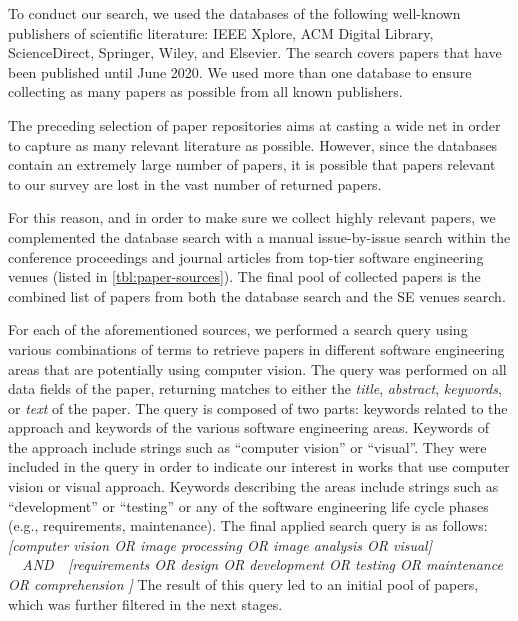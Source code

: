 To conduct our search, we used the databases of the following
well-known publishers of scientific literature:
IEEE Xplore, ACM Digital Library, ScienceDirect, Springer, Wiley, and Elsevier.
The search covers papers that have been published until June 2020. 
We used more than one database to ensure collecting
as many papers as possible from all known publishers.

The preceding selection of paper repositories
aims at casting a wide net in order to capture as many
relevant literature as possible.
However, since the databases contain an extremely large
number of papers, it is possible that papers 
relevant to our survey are lost in the vast number of returned papers.

For this reason, and in order to make sure we collect highly relevant papers, we complemented the database search with a manual issue-by-issue search within the conference proceedings and journal articles from 
top-tier software engineering venues (listed in \autoref{tbl:paper-sources}).
The final pool of collected papers is the combined list of papers from both the database search and the SE venues search.


 For each of the aforementioned sources, 
we performed a search query using various combinations
of terms to retrieve papers in different software engineering areas
that are potentially using computer vision.
The query was performed on all data fields of the paper,
returning matches to either the \emph{title}, \emph{abstract},
\emph{keywords}, or \emph{text} of the paper.
The query is composed of two parts: keywords related to the approach
and keywords of the various software engineering areas.
Keywords of the approach include strings such as
``computer vision'' or ``visual''.
They were included in the query in order to indicate
our interest in works that use computer vision or visual approach.
Keywords describing the areas include strings such as
``development'' or ``testing'' or any of the software engineering
life cycle phases (e.g., requirements, maintenance).
The final applied search query is as follows:
\emph{{[}computer vision {OR} image processing 
{OR} image analysis {OR} visual{]}
\ \ {AND}\ \ 
{[}requirements {OR} design {OR} development 
{OR} testing {OR} maintenance {OR} comprehension {]}}
The result of this query led to an initial pool of \initialPoolSize papers,
which was further filtered in the next stages.

